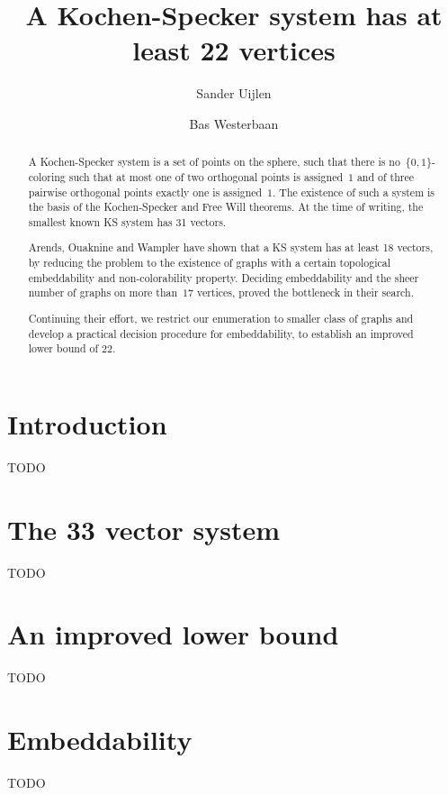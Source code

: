 \documentclass[a4paper]{article}
\title{A Kochen-Specker system has at least 22 vertices}
\author{Sander Uijlen}
\author{Bas Westerbaan}
\affil{Institute for Computing and Information Sciences\\
       Radboud Universiteit Nijmegen\\
   \{\texttt{bwesterb},\texttt{suijlen}\}\texttt{@cs.ru.nl}}
\begin{document}
\maketitle

\begin{abstract}
    A Kochen-Specker system is a set of points on the sphere,
    such that there is no~$\{0,1\}$-coloring such that
    at most one of two orthogonal points is assigned~$1$
    and of three pairwise orthogonal points exactly one
    is assigned~$1$.
    The existence of such a system is the basis of the Kochen-Specker
    and Free Will theorems.  At the time of writing, the smallest known
    KS system has 31 vectors.  

    Arends, Ouaknine and Wampler have shown that a KS system has at least
    18 vectors, by reducing the problem to the existence of graphs
    with a certain topological embeddability and non-colorability property.
    Deciding embeddability and the sheer number of graphs on more than~$17$
    vertices, proved the bottleneck in their search.

    Continuing their effort, we restrict our enumeration to smaller class of
    graphs and develop a practical decision procedure for embeddability, to
    establish an improved lower bound of 22.
\end{abstract}
    
\section{Introduction}
TODO

\section{The 33 vector system}
TODO

\section{An improved lower bound}
TODO

\section{Embeddability}
TODO

{}

\end{document}
